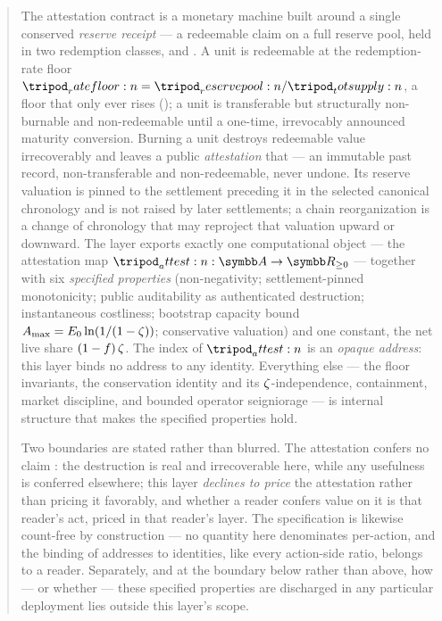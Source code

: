 \documentclass[../main.tex]{subfiles}
\begin{document}
\begin{abstract}
    \label{abst:attestation:abstract}

    The attestation contract is a monetary machine built around a single conserved
    \emph{reserve receipt} --- a redeemable claim on a full reserve pool, held in two
    redemption classes, \liveclass{} and \tlockclass{}. A \liveclass{} unit is redeemable
    at the redemption-rate floor $\ratefloor{} = \reservepool{}/\totsupply{}$, a floor that
    only ever rises (); a \tlockclass{} unit is
    transferable but structurally non-burnable and non-redeemable until a one-time,
    irrevocably announced maturity conversion. Burning a \liveclass{} unit destroys
    redeemable value irrecoverably and leaves a public \emph{attestation} that
     --- an immutable
    past record, non-transferable and non-redeemable, never undone. Its reserve valuation
    is pinned to the settlement preceding it in the selected canonical chronology and is
    not raised by later settlements; a chain reorganization is a change of chronology that
    may reproject that valuation upward or downward. The layer exports exactly one
    computational object --- the attestation map
    $\attest{} : \addrspace \to \R_{\geq 0}$ --- together with six \emph{specified
    properties} (non-negativity; settlement-pinned monotonicity; public auditability as
    authenticated destruction; instantaneous costliness; bootstrap capacity bound
    $\attestcap = \genesisreserve \ln(1/(1-\livesplit))$; conservative valuation) and one
    constant, the net live share $\netliveshare$. The index of $\attest{}$ is an
    \emph{opaque address}: this layer binds no address to any identity. Everything else ---
    the floor invariants, the conservation identity and its $\livesplit$-independence,
    containment, market discipline, and bounded operator seigniorage --- is internal
    structure that makes the specified properties hold.

    Two boundaries are stated rather than blurred. The attestation confers no claim
    \atthislayer{}: the destruction is real and irrecoverable here, while any usefulness is
    conferred elsewhere; this layer \emph{declines to price} the attestation rather than
    pricing it favorably, and whether a reader confers value on it is that reader's act,
    priced in that reader's layer. The specification is likewise count-free by
    construction --- no quantity here denominates per-action, and the binding of addresses
    to identities, like every action-side ratio, belongs to a reader. Separately, and at
    the boundary below rather than above, how --- or whether --- these specified properties
    are discharged in any particular deployment lies outside this layer's scope.
\end{abstract}
\end{document}

